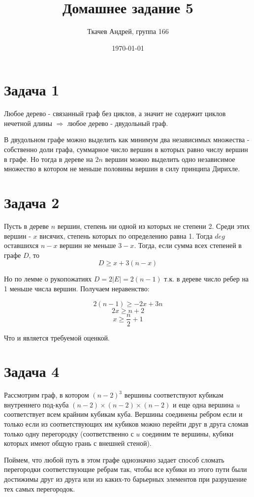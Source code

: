 \documentclass{article}
\title{Домашнее задание 5}
\author{Ткачев Андрей, группа 166}
\date{\today}
\begin{document}
	\maketitle
	
	\section{Задача 1}
	Любое дерево - связанный граф без циклов, а значит не содержит циклов нечетной длины $\Rightarrow$ любое дерево - двудольный граф. 
		
	В двудольном графе можно выделить как минимум два независимых множества - собственно доли графа, суммарное число вершин в которых равно числу вершин в графе. Но тогда в дереве на $2n$ вершин можно выделить одно независимое множество в котором не меньше половины вершин в силу принципа Дирихле.
	
	\section{Задача 2}
	Пусть в дереве $n$ вершин, степень ни одной из которых не степени 2. Среди этих вершин - $x$ висячих, степень которых по определению равна 1. Тогда $deg$ оставшихся $n - x$ вершин не меньше $3 - x$. Тогда, если сумма всех степеней в графе $D$, то
	$$ D \geqslant x  + 3(n - x)$$
	
	Но по лемме о рукопожатиях $D = 2|E| = 2(n - 1)$ т.к. в дереве число ребер на 1 меньше числа вершин. Получаем неравенство:
	
	$$ 2(n - 1) \geqslant -2x + 3n$$
	$$ 2x \geqslant n + 2$$
	$$ x \geqslant \frac{n}{2} + 1$$
	
	Что и является требуемой оценкой.
	
	\section{Задача 4}
	
	Рассмотрим граф, в котором $(n - 2)^3$ вершины соответствуют кубикам внутреннего под-куба $(n - 2) \times (n - 2) \times (n - 2)$ и еще одна вершина $u$ соответствует всем крайним кубикам куба. Вершины соединены ребром если и только если из соответствующих им кубиков можно перейти друг в друга сломав только одну перегородку (соответственно с $u$ соединим те вершины, кубики которых имеют общую грань с внешней стеной).
	
	Поймем, что любой путь в этом графе однозначно задает способ сломать перегородки соответствующие ребрам так, чтобы все кубики из этого пути были достижимы друг из друга или из каких-то барьерных элементов при разрушение тех самых перегородок. 
	
\end{document}
